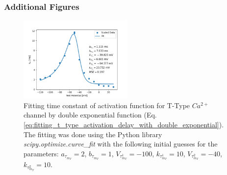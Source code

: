 \documentclass[../../workflow.tex]{subfiles}
\begin{document}
\subsubsection{Additional Figures}
\begin{figure}[H]
    \centering
    \includegraphics[width=0.5\textwidth, page=1]{./img/t_type_calcium_channel/activation_fit_by_double_exponentials.png}
    \caption{
        Fitting time constant of activation function for T-Type $Ca^{2+}$ channel by double exponential function
        (Eq. \ref{eq:fitting_t_type_activation_delay_with_double_exponential}). The fitting was done using the Python
        library \textit{scipy.optimize.curve\_fit} with the following initial guesses for the parameters:
        $a_{\tau_{m_T}}=2$, $b_{\tau_{m_T}}=1$, $V_{\tau_{m_T}^1}=-100$, $k_{\tau_{m_T}^1}=10$,
        $V_{\tau_{m_T}^2}=-40$, $k_{\tau_{m_T}^2}=10$.
    }
\end{figure}

\newpage
\printbibliography
\end{document}
